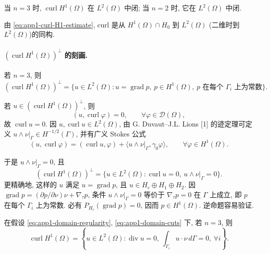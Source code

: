 \begin{Lemma}
\label{lem:app1-curl-range-closed}
当 $n=3$ 时, $\operatorname{curl}H^1(\Omega)$ 在 $L^2(\Omega)$ 中闭; 当 $n=2$ 时, 它在 $L^2(\Omega)$ 中闭.
\end{Lemma}

\begin{Proof}
由 \eqref{eq:app1-curl-H1-estimate}, curl 是从 $H^1(\Omega)\cap H_0$ 到 $L^2(\Omega)$ (二维时到 $L^2(\Omega)$)的同构.
\end{Proof}

\paragraph{$(\operatorname{curl}H^1(\Omega))^\perp$ 的刻画.}

\begin{Proposition}
\label{prop:app1-curl-orthogonal-complement}
若 $n=3$, 则
\[
(\operatorname{curl}H^1(\Omega))^\perp
=\{u\in L^2(\Omega):u=\operatorname{grad}p,
\ p\in H^1(\Omega),\ p\text{ 在每个 }\Gamma_i\text{ 上为常数}\}.
\]
\end{Proposition}

\begin{Proof}
若 $u\in(\operatorname{curl}H^1(\Omega))^\perp$, 则
\[
(u,\operatorname{curl}\varphi)=0,
\qquad\forall\varphi\in\mathcal D(\Omega),
\]
故 $\operatorname{curl}u=0$. 因 $u,\operatorname{curl}u\in L^2(\Omega)$, 由 G. Duvaut--J.L. Lions [1] 的迹定理可定义 $u\wedge\nu|_\Gamma\in H^{-1/2}(\Gamma)$, 并有广义 Stokes 公式
\begin{equation}
(u,\operatorname{curl}\varphi)
=(\operatorname{curl}u,\varphi)
+\langle u\wedge\nu|_\Gamma,\gamma_0\varphi\rangle,
\qquad\forall\varphi\in H^1(\Omega).
\label{eq:app1-generalized-curl-stokes}
\end{equation}

\hypertarget{appendix-01-page-332}{}
于是 $u\wedge\nu|_\Gamma=0$, 且
\[
(\operatorname{curl}H^1(\Omega))^\perp
=\{u\in L^2(\Omega):\operatorname{curl}u=0,
\ u\wedge\nu|_\Gamma=0\}.
\]
更精确地, 这样的 $u$ 满足 $u=\operatorname{grad}p$, 且 $u\in H_c\oplus H_1\oplus H_2$. 因 $\operatorname{grad}p=(\partial p/\partial\nu)\nu+\nabla_\tau p$, 条件 $u\wedge\nu|_\Gamma=0$ 等价于 $\nabla_\tau p=0$ 在 $\Gamma$ 上成立, 即 $p$ 在每个 $\Gamma_i$ 上为常数. 必有 $P_{H_c}(\operatorname{grad}p)=0$, 因而 $p\in H^1(\Omega)$. 逆命题容易验证.
\end{Proof}

\begin{Proposition}
\label{prop:app1-curl-range-characterization}
在假设 \eqref{eq:app1-domain-regularity}, \eqref{eq:app1-domain-cuts} 下, 若 $n=3$, 则
\[
\operatorname{curl}H^1(\Omega)
=\left\{u\in L^2(\Omega):\operatorname{div}u=0,
\ \int_{\Gamma_i}u\cdot\nu\,d\Gamma=0,
\ \forall i\right\}.
\]
\end{Proposition}

